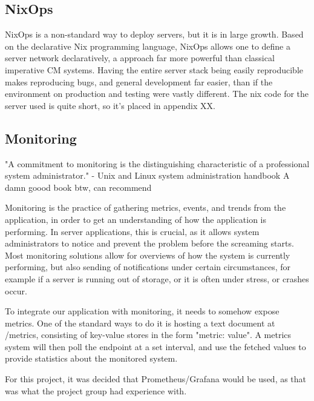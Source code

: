 \subsection{NixOps}
NixOps is a non-standard way to deploy servers, but it is in large growth.
Based on the declarative Nix programming language, NixOps allows one to define a server network declaratively, a approach far more powerful than classical imperative CM systems.
Having the entire server stack being easily reproducible makes reproducing bugs, and general development far easier, than if the environment on production and testing were vastly different.
The nix code for the server used is quite short, so it's placed in appendix XX.

\subsection{Monitoring}
"A commitment to monitoring is the distinguishing characteristic of a professional system administrator." - Unix and Linux system administration handbook
A damn goood book btw, can recommend

Monitoring is the practice of gathering metrics, events, and trends from the application, in order to get an understanding of how the application is performing.
In server applications, this is crucial, as it allows system administrators to notice and prevent the problem before the screaming starts.
Most monitoring solutions allow for overviews of how the system is currently performing, but also sending of notifications under certain circumstances, for example if a server is running out of storage, or it is often under stress, or crashes occur.

To integrate our application with monitoring, it needs to somehow expose metrics.
One of the standard ways to do it is hosting a text document at /metrics, consisting of key-value stores in the form "metric: value".
A metrics system will then poll the endpoint at a set interval, and use the fetched values to provide statistics about the monitored system.

For this project, it was decided that Prometheus/Grafana would be used, as that was what the project group had experience with.

